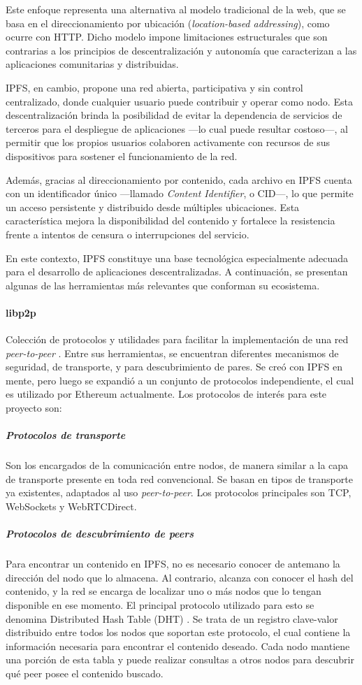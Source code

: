 Este enfoque representa una alternativa al modelo tradicional de la web, que se basa en el direccionamiento por ubicación (\textit{location-based addressing}), como ocurre con HTTP. Dicho modelo impone limitaciones estructurales que son contrarias a los principios de descentralización y autonomía que caracterizan a las aplicaciones comunitarias y distribuidas.

IPFS, en cambio, propone una red abierta, participativa y sin control centralizado, donde cualquier usuario puede contribuir y operar como nodo. Esta descentralización brinda la posibilidad de evitar la dependencia de servicios de terceros para el despliegue de aplicaciones —lo cual puede resultar costoso—, al permitir que los propios usuarios colaboren activamente con recursos de sus dispositivos para sostener el funcionamiento de la red.

Además, gracias al direccionamiento por contenido, cada archivo en IPFS cuenta con un identificador único —llamado \textit{Content Identifier}, o CID—, lo que permite un acceso persistente y distribuido desde múltiples ubicaciones. Esta característica mejora la disponibilidad del contenido y fortalece la resistencia frente a intentos de censura o interrupciones del servicio.

En este contexto, IPFS constituye una base tecnológica especialmente adecuada para el desarrollo de aplicaciones descentralizadas. A continuación, se presentan algunas de las herramientas más relevantes que conforman su ecosistema.

\paragraph{libp2p}
Colección de protocolos y utilidades para facilitar la implementación de una red  \textit{peer-to-peer} \cite{libp2p}. Entre sus herramientas, se encuentran diferentes mecanismos de seguridad, de transporte, y para descubrimiento de pares. Se creó con IPFS en mente, pero luego se expandió a un conjunto de protocolos independiente, el cual es utilizado por Ethereum actualmente. Los protocolos de interés para este proyecto son:

\subparagraph{Protocolos de transporte} 
Son los encargados de la comunicación entre nodos, de manera similar a la capa de transporte presente en toda red convencional. Se basan en tipos de transporte ya existentes, adaptados al uso  \textit{peer-to-peer}. Los protocolos principales son TCP, WebSockets y WebRTCDirect.

\subparagraph{Protocolos de descubrimiento de peers} Para encontrar un contenido en IPFS, no es necesario conocer de antemano la dirección del nodo que lo almacena. Al contrario, alcanza con conocer el hash del contenido, y la red se encarga de localizar uno o más nodos que lo tengan disponible en ese momento. El principal protocolo utilizado para esto se denomina Distributed Hash Table (DHT) \cite{dht} \cite{kadmelia}. Se trata de un registro clave-valor distribuido entre todos los nodos que soportan este protocolo, el cual contiene la información necesaria para encontrar el contenido deseado. Cada nodo mantiene una porción de esta tabla y puede realizar consultas a otros nodos para descubrir qué peer posee el contenido buscado.

